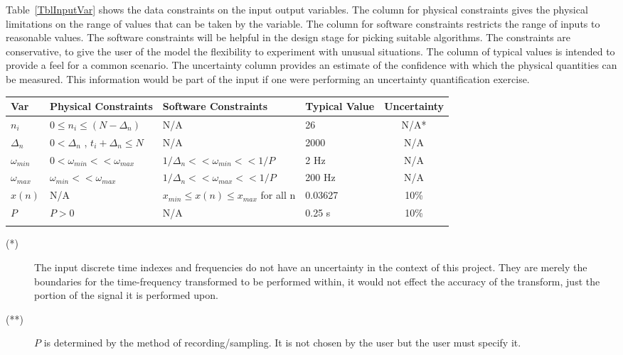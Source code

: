 \documentclass[12pt]{article}
\begin{document}
Table~\ref{TblInputVar} shows the data constraints on the input output
variables.  The column for physical constraints gives the physical limitations
on the range of values that can be taken by the variable.  The column for
software constraints restricts the range of inputs to reasonable values.  The
software constraints will be helpful in the design stage for picking suitable
algorithms.  The constraints are conservative, to give the user of the model the
flexibility to experiment with unusual situations.  The column of typical values
is intended to provide a feel for a common scenario.  The uncertainty column
provides an estimate of the confidence with which the physical quantities can be
measured.  This information would be part of the input if one were performing an
uncertainty quantification exercise.

\begin{table}[!h]
  \caption{Input Variables} \label{TblInputVar}
  \renewcommand{\arraystretch}{1.2}
\noindent \begin{longtable*}{l l l l c} 
  \toprule
  \textbf{Var} & \textbf{Physical Constraints} & \textbf{Software Constraints} &
                             \textbf{Typical Value} & \textbf{Uncertainty}\\
  \midrule 
  $n_i$ & $ 0 \leq n_i \leq (N - \Delta_n) $ & N/A & 26 & N/A*
  \\
  $\Delta_n$ & $ 0 < \Delta_n$ , $ t_i + \Delta_n \leq N$ & N/A & 2000 & N/A \text{*} 
  \\
  $\omega_{min}$ & $ 0 < \omega_{min} << \omega_{max}$ & $  1/\Delta_n << \omega_{min} << 1/P $ & 2 Hz & N/A \text{*} \\
    $\omega_{max}$ & $ \omega_{min} << \omega_{max} $ & $  1/\Delta_n << \omega_{max} << 1/P $ & 200 Hz & N/A \text{*} \\
   $ x(n) $ & N/A & $ x_{min} \leq x(n) \leq x_{max}$ for all n & 0.03627 & 10\%\\
   $P$ & $P > 0$ & N/A & 0.25 \si{\second} & 10\% \\
\bottomrule \\
\end{longtable*}
\end{table}

\noindent 
\begin{description}
\item[(*)] The input discrete time indexes and frequencies do not have an uncertainty in the context of this project. They are merely the boundaries for the time-frequency transformed to be performed within, it would not effect the accuracy of the transform, just the portion of the signal it is performed upon.
\item[(**)] $P$ is determined by the method of recording/sampling. It is not chosen by the user but the user must specify it.
\end{description}
\end{document}
